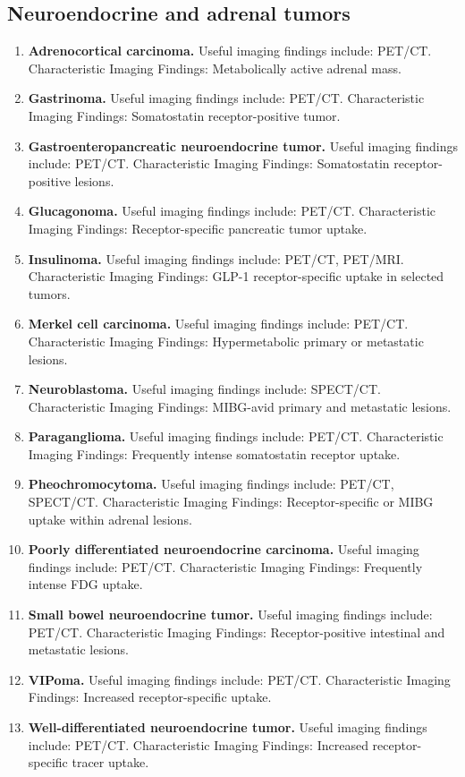 \subsection{Neuroendocrine and adrenal tumors}
\begin{enumerate}[leftmargin=*,itemsep=0.45em,topsep=0.4em]
\item \textbf{Adrenocortical carcinoma.} Useful imaging findings include: PET/CT. Characteristic Imaging Findings: Metabolically active adrenal mass.
\item \textbf{Gastrinoma.} Useful imaging findings include: PET/CT. Characteristic Imaging Findings: Somatostatin receptor-positive tumor.
\item \textbf{Gastroenteropancreatic neuroendocrine tumor.} Useful imaging findings include: PET/CT. Characteristic Imaging Findings: Somatostatin receptor-positive lesions.
\item \textbf{Glucagonoma.} Useful imaging findings include: PET/CT. Characteristic Imaging Findings: Receptor-specific pancreatic tumor uptake.
\item \textbf{Insulinoma.} Useful imaging findings include: PET/CT, PET/MRI. Characteristic Imaging Findings: GLP-1 receptor-specific uptake in selected tumors.
\item \textbf{Merkel cell carcinoma.} Useful imaging findings include: PET/CT. Characteristic Imaging Findings: Hypermetabolic primary or metastatic lesions.
\item \textbf{Neuroblastoma.} Useful imaging findings include: SPECT/CT. Characteristic Imaging Findings: MIBG-avid primary and metastatic lesions.
\item \textbf{Paraganglioma.} Useful imaging findings include: PET/CT. Characteristic Imaging Findings: Frequently intense somatostatin receptor uptake.
\item \textbf{Pheochromocytoma.} Useful imaging findings include: PET/CT, SPECT/CT. Characteristic Imaging Findings: Receptor-specific or MIBG uptake within adrenal lesions.
\item \textbf{Poorly differentiated neuroendocrine carcinoma.} Useful imaging findings include: PET/CT. Characteristic Imaging Findings: Frequently intense FDG uptake.
\item \textbf{Small bowel neuroendocrine tumor.} Useful imaging findings include: PET/CT. Characteristic Imaging Findings: Receptor-positive intestinal and metastatic lesions.
\item \textbf{VIPoma.} Useful imaging findings include: PET/CT. Characteristic Imaging Findings: Increased receptor-specific uptake.
\item \textbf{Well-differentiated neuroendocrine tumor.} Useful imaging findings include: PET/CT. Characteristic Imaging Findings: Increased receptor-specific tracer uptake.
\end{enumerate}

